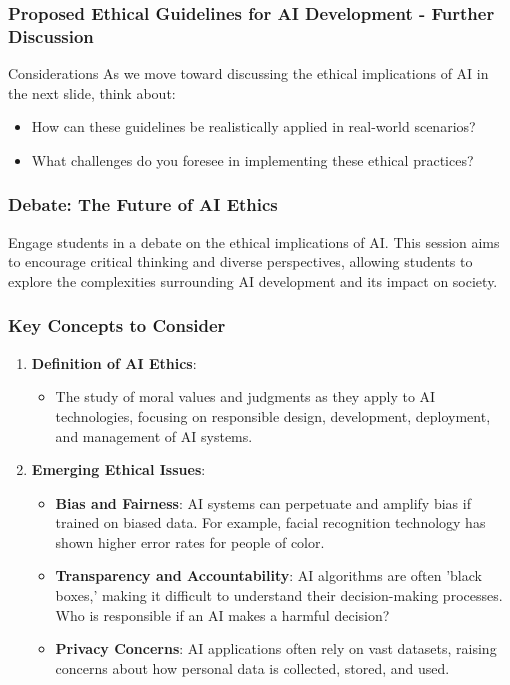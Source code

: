 \documentclass{beamer}
\begin{document}
\begin{frame}[fragile]
    \frametitle{Proposed Ethical Guidelines for AI Development - Further Discussion}
    \begin{block}{Considerations}
        As we move toward discussing the ethical implications of AI in the next slide, think about:
        \begin{itemize}
            \item How can these guidelines be realistically applied in real-world scenarios?
            \item What challenges do you foresee in implementing these ethical practices?
        \end{itemize}
    \end{block}
\end{frame}

\begin{frame}[fragile]
    \frametitle{Debate: The Future of AI Ethics}
    Engage students in a debate on the ethical implications of AI. 
    This session aims to encourage critical thinking and diverse perspectives, allowing students to explore the complexities surrounding AI development and its impact on society.
\end{frame}

\begin{frame}[fragile]
    \frametitle{Key Concepts to Consider}
    \begin{enumerate}
        \item \textbf{Definition of AI Ethics}:
        \begin{itemize}
            \item The study of moral values and judgments as they apply to AI technologies, focusing on responsible design, development, deployment, and management of AI systems.
        \end{itemize}
        
        \item \textbf{Emerging Ethical Issues}:
        \begin{itemize}
            \item \textbf{Bias and Fairness}: AI systems can perpetuate and amplify bias if trained on biased data. For example, facial recognition technology has shown higher error rates for people of color.
            \item \textbf{Transparency and Accountability}: AI algorithms are often 'black boxes,' making it difficult to understand their decision-making processes. Who is responsible if an AI makes a harmful decision?
            \item \textbf{Privacy Concerns}: AI applications often rely on vast datasets, raising concerns about how personal data is collected, stored, and used.
        \end{itemize}
    \end{enumerate}
\end{frame}
\end{document}
